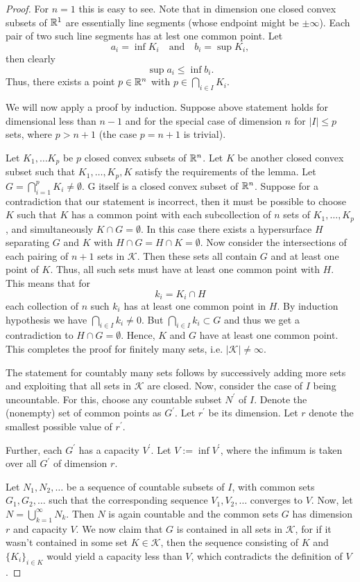 \begin{proof}
	For $n=1$ this is easy to see. Note that in dimension one closed convex subsets of $\mathbb{R}^1$ are essentially line segments (whose endpoint might be $\pm\infty$). Each pair of two such line segments has at lest one common point. Let 
	\[
	a_i=\inf K_i \quad\text{and}\quad b_i=\sup K_i,
	\]
	then clearly 
	\[
	\sup a_i\leq \inf b_i.
	\]
	Thus, there exists a point $p\in \mathbb{R}^n$ with $p\in\bigcap\limits_{i\in I} K_i$.
	
	We will now apply a proof by induction. Suppose above statement holds for dimensional less than $n-1$ and for the special case of dimension $n$ for $|I|\leq p$ sets, where $p>n+1$ (the case $p=n+1$ is trivial).
	
	Let $K_1,\dots K_p$ be $p$ closed convex subsets of $\mathbb{R}^n$. Let $K$ be another closed convex subset such that $K_1,\dots,K_p,K$ satisfy the requirements of the lemma. Let $G=\bigcap_{i=1}^p K_i\neq \emptyset$. G itself is a closed convex subset of $\mathbb{R}^n$. Suppose for a contradiction that our statement is incorrect, then it must be possible to choose $K$ such that $K$ has a common point with each subcollection of $n$ sets of $K_1,\dots,K_p$, and simultaneously $K\cap G=\emptyset$. In this case there exists a hypersurface $H$ separating $G$ and $K$ with $H\cap G=H\cap K=\emptyset$. Now consider the intersections of each pairing of $n+1$ sets in $\mathcal{K}$. Then these sets all contain $G$ and at least one point of $K$. Thus, all such sets must have at least one common point with $H$. This means that for 
	\[
	k_{i}=K_{i}\cap H
	\]
	each collection of $n$ such $k_i$ has at least one common point in $H$. By induction hypothesis we have $\bigcap_{i\in I}k_i\neq 0$. But $\bigcap_{i\in I}k_i\subset G$ and thus we get a contradiction to $H\cap G=\emptyset$. Hence, $K$ and $G$ have at least one common point. This completes the proof for finitely many sets, i.e. $|\mathcal{K}|\neq \infty$.
	
	The statement for countably many sets follows by successively adding more sets and exploiting that all sets in $\mathcal{K}$ are closed. Now, consider the case of $I$ being uncountable. For this, choose any countable subset $N^\prime$ of $I$. Denote the (nonempty) set of common points as $G^\prime$. Let $r^\prime$ be its dimension. Let $r$ denote the smallest possible value of $r^\prime$.
	
	Further, each $G^\prime$ has a capacity %
	$V^\prime$. Let $V:=\inf V^\prime$, where the infimum is taken over all $G^\prime$ of dimension $r$.
	
	Let $N_1,N_2,\dots$ be a sequence of countable subsets of $I$, with common sets $G_1,G_2,\dots$ such that the corresponding sequence $V_1,V_2,\dots$ converges to $V$. Now, let $N=\bigcup_{k=1}^\infty N_k$. Then $N$ is again countable and the common sets $G$ has dimension $r$ and capacity $V$. We now claim that $G$ is contained in all sets in $\mathcal{K}$, for if it wasn't contained in some set $K\in \mathcal{K}$, then the sequence consisting of $K$ and $\{K_i\}_{i\in K}$ would yield a capacity less than $V$, which contradicts the definition of $V$.
\end{proof}

